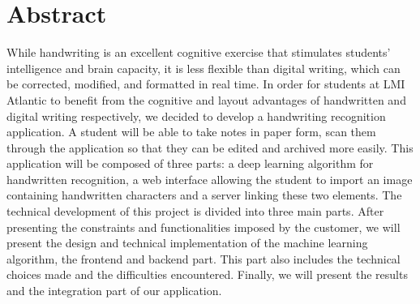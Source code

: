 \documentclass[oneside,a4paper,13pt]{article}
\begin{document}
\section*{Abstract}
While handwriting is an excellent cognitive exercise that stimulates students' intelligence and brain capacity, it is less flexible than digital writing, which can be corrected, modified, and formatted in real time. In order for students at LMI Atlantic to benefit from the cognitive and layout advantages of handwritten and digital writing respectively, we decided to develop a handwriting recognition application. 
A student will be able to take notes in paper form, scan them through the application so that they can be edited and archived more easily. This application will be composed of three parts: a deep learning algorithm for handwritten recognition, a web interface allowing the student to import an image containing handwritten characters and a server linking these two elements. 
\smallbreak
The technical development of this project is divided into three main parts. After presenting the constraints and functionalities imposed by the customer, we will present the design and technical implementation of the machine learning algorithm, the frontend and backend part. This part also includes the technical choices made and the difficulties encountered. Finally, we will present the results and the integration part of our application. 


\newpage
\tableofcontents
\end{document}
